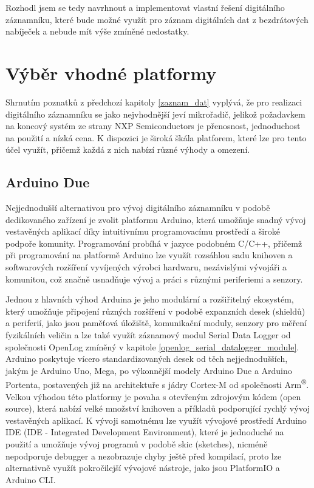 Rozhodl jsem se tedy navrhnout a implementovat vlastní řešení digitálního záznamníku, které bude možné využít pro záznam digitálních dat z bezdrátových nabíječek a nebude mít výše zmíněné nedostatky.

\section{Výběr vhodné platformy}
Shrnutím poznatků z předchozí kapitoly \ref{zaznam_dat} vyplývá, že pro realizaci digitálního záznamníku se jako nejvhodnější jeví mikrořadič, jelikož požadavkem na koncový systém ze strany NXP Semiconductors je přenosnost, jednoduchost na použití a nízká cena. K dispozici je široká škála platforem, které lze pro tento účel využít, přičemž každá z nich nabízí různé výhody a omezení.


\subsection{Arduino Due}
Nejjednodušší alternativou pro vývoj digitálního záznamníku v podobě dedikovaného zařízení je zvolit platformu Arduino, která umožňuje snadný vývoj vestavěných aplikací díky intuitivnímu programovacímu prostředí a široké podpoře komunity. Programování probíhá v jazyce podobném C/C++, přičemž při programování na platformě Arduino lze využít rozsáhlou sadu knihoven a softwarových rozšíření vyvíjených výrobci hardwaru, nezávislými vývojáři a komunitou, což značně usnadňuje vývoj a práci s různými periferiemi a senzory.

Jednou z hlavních výhod Arduina je jeho modulární a rozšiřitelný ekosystém, který umožňuje připojení různých rozšíření v podobě expanzních desek (shieldů) a periferií, jako jsou paměťová úložiště, komunikační moduly, senzory pro měření fyzikálních veličin a lze také využít záznamový modul Serial Data Logger od společnosti OpenLog zmíněný v kapitole \ref{openlog_serial_datalogger_module}. Arduino poskytuje vícero standardizovaných desek od těch nejjednodušších, jakým je Arduino Uno, Mega, po výkonnější modely Arduino Due a Arduino Portenta, postavených již na architektuře s jádry Cortex-M od společnosti Arm\textsuperscript{®}. Velkou výhodou této platformy je povaha s otevřeným zdrojovým kódem (open source), která nabízí velké množství knihoven a příkladů podporující rychlý vývoj vestavěných aplikací. K vývoji samotnému lze využít vývojové prostředí Arduino IDE (IDE - Integrated Development Environment), které je jednoduché na použití a umožňuje vývoj programů v podobě skic (sketches), nicméně nepodporuje debugger a nezobrazuje chyby ještě před kompilací, proto lze alternativně využít pokročilejší vývojové nástroje, jako jsou PlatformIO a Arduino CLI.

